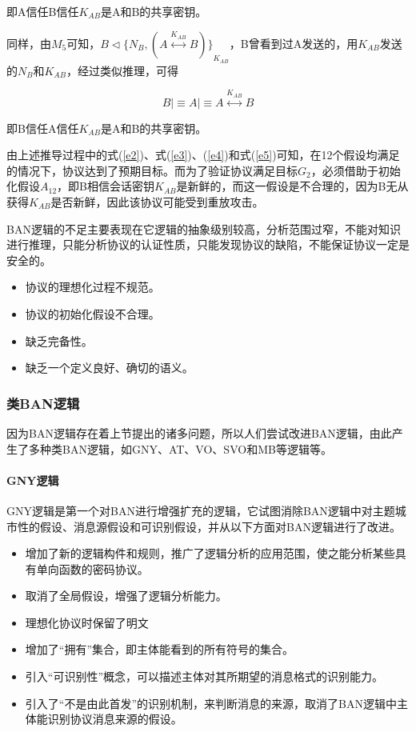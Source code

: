 \documentclass[cs4size,a4pape,UTF8]{ctexart}
\numberwithin{equation}{section}
\numberwithin{table}{section}
\numberwithin{figure}{section}
\begin{document}
即A信任B信任$K_{AB}$是A和B的共享密钥。

同样，由$M_{5}$可知，$B\triangleleft{\{N_{B},(A\stackrel{K_{AB}}{\longleftrightarrow}B)\}}_{K_{AB}}$，B曾看到过A发送的，用$K_{AB}$发送的$N_{B}$和$K_{AB}$，经过类似推理，可得

\begin{equation}
B{\lvert\equiv}A{\lvert\equiv}A\stackrel{K_{AB}}{\longleftrightarrow}B\label{e5}
\end{equation}

即B信任A信任$K_{AB}$是A和B的共享密钥。

由上述推导过程中的式(\ref{e2})、式(\ref{e3})、(\ref{e4})和式(\ref{e5})可知，在12个假设均满足的情况下，协议达到了预期目标。而为了验证协议满足目标$G_{2}$，必须借助于初始化假设$A_{12}$，即B相信会话密钥$K_{AB}$是新鲜的，而这一假设是不合理的，因为B无从获得$K_{AB}$是否新鲜，因此该协议可能受到重放攻击。\vspace{12pt}

BAN逻辑的不足主要表现在它逻辑的抽象级别较高，分析范围过窄，不能对知识进行推理，只能分析协议的认证性质，只能发现协议的缺陷，不能保证协议一定是安全的\cite{4}。

\begin{itemize}
\item 协议的理想化过程不规范。
\item 协议的初始化假设不合理。
\item 缺乏完备性。
\item 缺乏一个定义良好、确切的语义。
\end{itemize}

\subsubsection{类BAN逻辑}

因为BAN逻辑存在着上节提出的诸多问题，所以人们尝试改进BAN逻辑，由此产生了多种类BAN逻辑，如GNY、AT、VO、SVO和MB等逻辑等。

\paragraph{GNY逻辑}

GNY逻辑是第一个对BAN进行增强扩充的逻辑，它试图消除BAN逻辑中对主题城市性的假设、消息源假设和可识别假设，并从以下方面对BAN逻辑进行了改进。

\begin{itemize}
\item 增加了新的逻辑构件和规则，推广了逻辑分析的应用范围，使之能分析某些具有单向函数的密码协议。
\item 取消了全局假设，增强了逻辑分析能力。
\item 理想化协议时保留了明文
\item 增加了“拥有”集合，即主体能看到的所有符号的集合。
\item 引入“可识别性”概念，可以描述主体对其所期望的消息格式的识别能力。
\item 引入了“不是由此首发”的识别机制，来判断消息的来源，取消了BAN逻辑中主体能识别协议消息来源的假设。
\end{itemize}
\end{document}
